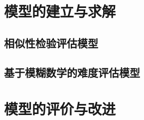 \section{模型的建立与求解}

\subsection{相似性检验评估模型}

\subsection{基于模糊数学的难度评估模型}

\subsection{}

\section{模型的评价与改进}
